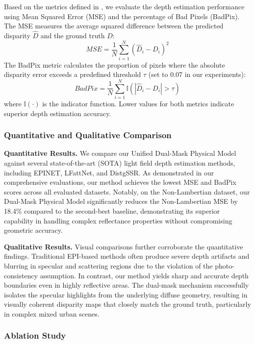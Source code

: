 \documentclass[lettersize,journal]{IEEEtran}
\begin{document}
Based on the metrics defined in \cite{slopeslope}, we evaluate the depth estimation performance using Mean Squared Error (MSE) and the percentage of Bad Pixels (BadPix). The MSE measures the average squared difference between the predicted disparity $\hat{D}$ and the ground truth $D$:
\begin{equation}
\label{eq:eq18}
MSE = \frac{1}{N} \sum_{i=1}^{N} (\hat{D}_i - D_i)^2
\end{equation}
The BadPix metric calculates the proportion of pixels where the absolute disparity error exceeds a predefined threshold $\tau$ (set to 0.07 in our experiments):
\begin{equation}
\label{eq:eq19}
BadPix = \frac{1}{N} \sum_{i=1}^{N} \mathbb{I}(|\hat{D}_i - D_i| > \tau)
\end{equation}
where $\mathbb{I}(\cdot)$ is the indicator function. Lower values for both metrics indicate superior depth estimation accuracy.

\subsubsection{Quantitative and Qualitative Comparison}

\textbf{Quantitative Results.} 
We compare our Unified Dual-Mask Physical Model against several state-of-the-art (SOTA) light field depth estimation methods, including EPINET, LFattNet, and DistgSSR. As demonstrated in our comprehensive evaluations, our method achieves the lowest MSE and BadPix scores across all evaluated datasets. Notably, on the Non-Lambertian dataset, our Dual-Mask Physical Model significantly reduces the Non-Lambertian MSE by 18.4\% compared to the second-best baseline, demonstrating its superior capability in handling complex reflectance properties without compromising geometric accuracy.

\textbf{Qualitative Results.} 
Visual comparisons further corroborate the quantitative findings. Traditional EPI-based methods often produce severe depth artifacts and blurring in specular and scattering regions due to the violation of the photo-consistency assumption. In contrast, our method yields sharp and accurate depth boundaries even in highly reflective areas. The dual-mask mechanism successfully isolates the specular highlights from the underlying diffuse geometry, resulting in visually coherent disparity maps that closely match the ground truth, particularly in complex mixed urban scenes.

\subsubsection{Ablation Study}
\end{document}

